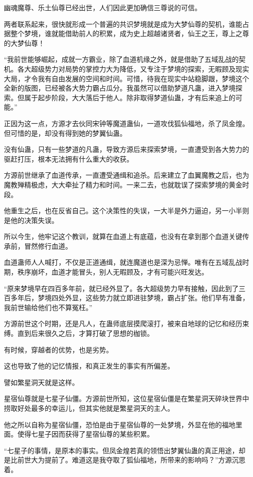 \begin{this_body}
幽魂魔尊、乐土仙尊已经出世，人们因此更加确信三尊说的可信。

两者联系起来，很快就形成一个普遍的共识梦境就是成为大梦仙尊的契机，谁能占据整个梦境，谁就能借助前人的积累，成为史上超越诸贤者，仙王之王，尊上之尊的大梦仙尊！

“我前世能够崛起，成就一方霸业，除了血道机缘之外，就是借助了五域乱战的契机。各大超级势力对局势的掌控力大为降低，又专注于梦境的探索，无暇顾及现实大局，才令我有自由发展的空间和时间。可惜，待我在现实中站稳脚跟，梦境这个全新的版图，已经被各大势力霸占瓜分。我虽然可以借助梦道凡蛊，进入梦境探索。但属于起步阶段，大大落后于他人。除非取得梦道仙蛊，才有后来追上的可能。”

正因为这一点，方源才去伙同宋钟等魔道蛊仙，一道攻伐狐仙福地，杀了凤金煌。但可惜的是，却没有得到她的梦翼仙蛊。

没有仙蛊，只有一些梦道的凡蛊，导致方源后来探索梦境，一直遭受到各大势力的驱赶打压，根本无法拥有什么重大的收获。

方源前世继承了血道传承，一直遭受通缉和追杀。后来建立了血翼魔教之后，也为魔教殚精极虑，大大牵扯了精力和时间。一来二去，也就耽误了探索梦境的黄金时段。

他重生之后，也在反省自己。这个决策性的失误，一大半是外力逼迫，另一小半则是他的决策失误。

所以今生，他牢记这个教训，就算在血道上有底蕴，也没有在拿到那个血道关键传承前，冒然修行血道。

血道蛊师人人喊打，不仅是正道通缉，就连魔道也是深为忌惮。唯有在五域乱战时期，秩序崩坏，血道才能冒头，别人无暇顾及，才有可能兴旺发达。

“原来梦境早在四百多年前，就已经外显了。各大超级势力早有接触，因此到了三百多年后，梦境四处外显，这些势力就立即进驻梦境，霸占扩张。他们早有准备，我前世输给他们也不算冤枉。”

方源前世这个时期，还是凡人，在蛊师底层摸爬滚打，被来自地球的记忆和经历束缚。直到后来很久之后，才算打破了思想的枷锁。

有时候，穿越者的优势，也是劣势。

这也导致了他的记忆情报，和真正发生的事实有所偏差。

譬如繁星洞天就是这样。

星宿仙尊就是七星子仙僵。方源前世所知，这位星宿仙僵是在繁星洞天碎块世界中捞取好处最多的幸运儿，但其实他就是繁星洞天的主人。

他之所以自称为星宿仙僵，恐怕是由于星宿仙尊的一处梦境，外显在他的福地里面。使得七星子因而获得了星宿仙尊的某些积累。

“七星子的事情，是原本的事实。但凤金煌若真的领悟出梦翼仙蛊的真正用途，却是比前世大为提前了。难道这是我夺取了狐仙福地，所带来的影响吗？”方源沉思着。


\end{this_body}
